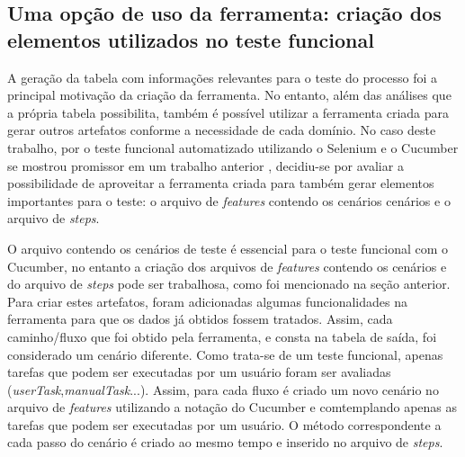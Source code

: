 \documentclass[12pt]{article}
\begin{document}
\subsection{Uma opção de uso da ferramenta: criação dos elementos utilizados no teste funcional}
A geração da tabela com informações relevantes para o teste do processo foi a principal motivação da criação da ferramenta. No entanto, além das análises que a própria tabela possibilita, também é possível utilizar a ferramenta criada para gerar outros artefatos conforme a necessidade de cada domínio. No caso deste trabalho, por o teste funcional automatizado utilizando o Selenium e o Cucumber se mostrou promissor em um trabalho anterior \cite{sbqs2015}, decidiu-se por avaliar a possibilidade de aproveitar a ferramenta criada para também gerar elementos importantes para o teste: o arquivo de \emph{features} contendo os cenários cenários e o arquivo de \emph{steps}.

O arquivo contendo os cenários de teste é essencial para o teste funcional com o Cucumber, no entanto a criação dos arquivos de \emph{features} contendo os cenários e do arquivo de \emph{steps} pode ser trabalhosa, como foi mencionado na seção anterior. Para criar estes artefatos, foram adicionadas algumas funcionalidades na ferramenta para que os dados já obtidos fossem tratados. Assim, cada caminho/fluxo que foi obtido pela ferramenta, e consta na tabela de saída, foi considerado um cenário diferente. Como trata-se de um teste funcional, apenas tarefas que podem ser executadas por um usuário foram ser avaliadas (\emph{userTask},\emph{manualTask}...). Assim, para cada fluxo é criado um novo cenário no arquivo de \emph{features} utilizando a notação do Cucumber e comtemplando apenas as tarefas que podem ser executadas por um usuário. O método correspondente a cada passo do cenário é criado ao mesmo tempo e inserido no arquivo de \emph{steps}. %

\end{document}
